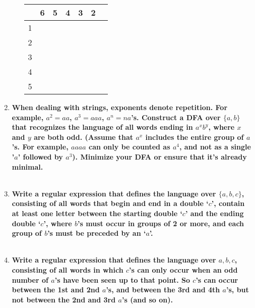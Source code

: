 \begin{enumerate}
\begin{enumerate}

\begin{table}[]
	\begin{tabular}{|c|c|c|c|c|c|c}
		\hline
		&  6 & 5 &  4 & 3  &   2 \\ \hline
		1 &  &  &  &  \\ \hline
		2  &  &  &  & \\ \hline
		3  &  &  &  & \\ \hline
		4  &  &  &  & \\ \hline
        5  &  &  &  & \\ \hline
	\end{tabular}
\end{table}

\end{enumerate}

\newpage
\item \textbf{When dealing with strings, exponents denote repetition. For
  example, $a^2=aa$, $a^3=aaa$, $a^n= n a$'s.  Construct a DFA over
  $\{a,b\}$ that recognizes the language of all words ending in $a^xb^y$,
  where $x$ and $y$ are both odd. (Assume that $a^x$ includes the entire group
  of $a$'s.  For example, $aaaa$ can only be counted as $a^4$, and not as a
  single '$a$' followed by $a^3$). Minimize your DFA or ensure that it's
  already minimal.}
\\\\


\newpage
\item \textbf{Write a regular expression that defines the language over
  $\{a,b,c\}$, consisting of all words that begin and end in a double ‘$c$’, contain at least one letter between the starting double ‘$c$’ and the ending double ‘$c$’, where $b$’s must occur in groups of 2  or more, and each group of $b$’s must be preceded by an ‘$a$’.}
\\\\

\newpage
\item \textbf{Write a regular expression that defines the language over
  ${a,b,c}$, consisting of all words in which $c$'s can only occur when an odd
  number of $a$'s have been seen up to that point. So $c$'s can occur between the 1st and 2nd $a$'s, and between the 3rd and 4th $a$'s, but not between the 2nd and 3rd $a$'s (and so on).}
\\\\



\end{enumerate}
